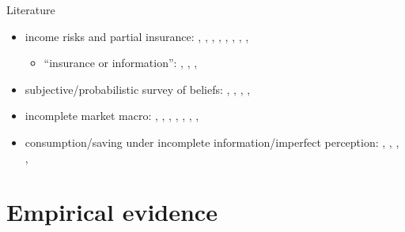 \documentclass{beamer}
\begin{document}
\begin{frame}{Literature}
	\begin{itemize}
		\item income risks and partial insurance: {\scriptsize\cite{gottschalk1994growth}, \cite{carroll1997nature}, \cite{meghir2004income}, \cite{storesletten2004cyclical}, \cite{blundell_consumption_2008}, \cite{moffitt2002trends},  \cite{guvenen2014nature},  \cite{arellano2017earnings}, \cite{bloom2018great}}
		\begin{itemize}
			\item ``insurance or information'': {\scriptsize \cite{pistaferri_superior_2001}, \cite{kaufmann_disentangling_2009}, \cite{meghir2011earnings}, \cite{kaplan2010much}}
		\end{itemize}
		\item subjective/probabilistic survey of beliefs: {\scriptsize\cite{manski_measuring_2004}, \cite{delavande2011measuring}, \cite{manski_survey_2018},  \cite{bertrand_people_2001}, \cite{armantier_overview_2017}} 
		\item incomplete market macro: {\scriptsize\cite{bewley1976permanent}, 
		 \cite{aiyagari1994uninsured},
		\cite{huggett1996wealth}, \cite{krusell1998income}, \cite{heathcote2009quantitative},  \cite{carroll2017distribution}, \cite{krueger2016macroeconomics},  \cite{bayer2019precautionary}}
		\item consumption/saving under incomplete information/imperfect perception:  {\scriptsize\cite{pischke1995individual}, \cite{wang2004precautionary}, \cite{rozsypal_overpersistence_2017}, \cite{carroll_sticky_2018}, \cite{lian2019imperfect}}
	
	\end{itemize}
\end{frame}


\section{Empirical evidence}
\end{document}
